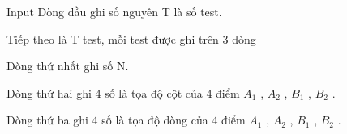 Input
Dòng đầu ghi số nguyên T là số test.

Tiếp theo là T test, mỗi test được ghi trên 3 dòng

Dòng thứ nhất ghi số N.

Dòng thứ hai ghi 4 số là tọa độ cột của 4 điểm $A_{1}$ , $A_{2}$ , $B_{1}$ , $B_{2}$ .

Dòng thứ ba ghi 4 số là tọa độ dòng của 4 điểm $A_{1}$ , $A_{2}$ , $B_{1}$ , $B_{2}$ .